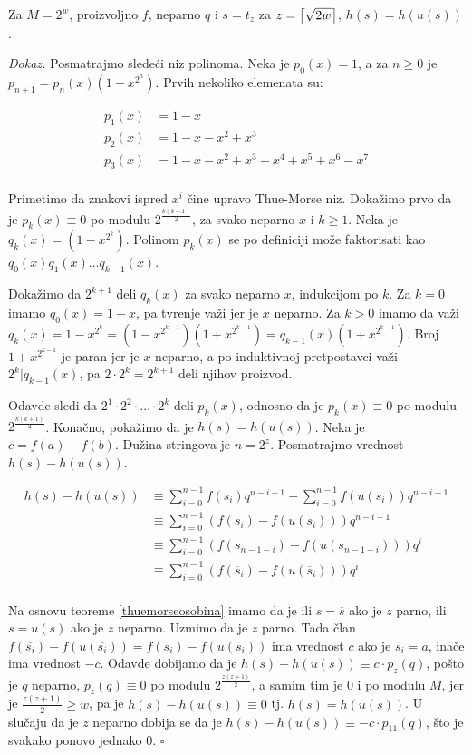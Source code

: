 \begin{thm}
Za $M = 2^{w}$, proizvoljno $f$, neparno $q$ i $s = t_z$ za $z = \left \lceil \sqrt{2w} \right \rceil$, $h(s) = h(u(s))$.
\end{thm}

\textit{Dokaz.} Posmatrajmo slede\' ci niz polinoma. Neka je $p_0(x) = 1$, a za $n \geq 0$ je $p_{n+1} = p_n(x)(1-x^{2^n})$. Prvih nekoliko elemenata su:

\begin{align*}
    p_1(x) & = 1-x \\
    p_2(x) & = 1-x-x^2+x^3 \\
    p_3(x) & = 1 - x - x^2 + x^3 - x^4 + x^5 + x^6 - x^7 \\
\end{align*}

Primetimo da znakovi ispred $x^i$ \v cine upravo Thue-Morse niz. Doka\v zimo prvo da je $p_k(x) \equiv 0$ po modulu $2^\frac{k(k+1)}{2}$, za svako neparno $x$ i $k \geq 1$. Neka je $q_k(x) = (1-x^{2^k})$. Polinom $p_k(x)$ se po definiciji mo\v ze faktorisati kao $q_0(x)q_1(x)\ldots q_{k-1}(x)$.

Doka\v zimo da $2^{k+1}$ deli $q_k(x)$ za svako neparno $x$, indukcijom po $k$. Za $k=0$ imamo $q_0(x) = 1-x$, pa tvr\dj enje va\v zi jer je $x$ neparno. Za $k > 0$ imamo da va\v zi $q_k(x) = 1-x^{2^k} = (1-x^{2^{k-1}})(1+x^{2^{k-1}}) = q_{k-1}(x)(1+x^{2^{k-1}})$. Broj $1+x^{2^{k-1}}$ je paran jer je $x$ neparno, a po induktivnoj pretpostavci va\v zi $2^k | q_{k-1}(x)$, pa $2\cdot 2^k = 2^{k+1}$ deli njihov proizvod.

Odavde sledi da $2^1\cdot2^2\cdot \ldots \cdot 2^k$ deli $p_k(x)$, odnosno da je $p_k(x) \equiv 0$ po modulu $2^\frac{k(k+1)}{2}$. Kona\v cno, poka\v zimo da je $h(s) = h(u(s))$. Neka je $c = f(a) - f(b)$. Du\v zina stringova je $n = 2^z$. Posmatrajmo vrednost $h(s) - h(u(s))$.

\begin{align*}
h(s) - h(u(s)) & \equiv \sum_{i=0}^{n-1}f(s_i) q^{n-i-1} - \sum_{i=0}^{n-1}f(u(s_i)) q^{n-i-1} \\
               & \equiv \sum_{i=0}^{n-1}(f(s_i) - f(u(s_i))) q^{n-i-1} \\
               & \equiv \sum_{i=0}^{n-1}(f(s_{n-1-i}) - f(u(s_{n-1-i}))) q^i \\
               & \equiv \sum_{i=0}^{n-1}(f(\overline{s}_i) - f(u(\overline{s}_i))) q^i \\
\end{align*}

Na osnovu teoreme \ref{thuemorseosobina} imamo da je ili $s = \overline{s}$ ako je $z$ parno, ili $s = u(s)$ ako je $z$ neparno. Uzmimo da je $z$ parno. Tada \v clan $f(\overline{s_i}) - f(u(\overline{s_i})) = f(s_i) - f(u(s_i))$ ima vrednost $c$ ako je $s_i = a$, ina\v ce ima vrednost $-c$.  Odavde dobijamo da je $h(s) - h(u(s)) \equiv c\cdot p_{z}(q)$, po\v sto je $q$ neparno, $p_{z}(q) \equiv 0$ po modulu $2^\frac{z(z+1)}{2}$, a samim tim je $0$ i po modulu $M$, jer je $\frac{z(z+1)}{2} \geq w$, pa je $h(s) - h(u(s)) \equiv 0$ tj. $h(s) = h(u(s))$. U slu\v caju da je $z$ neparno dobija se da je $h(s) - h(u(s)) \equiv -c\cdot p_{11}(q)$, \v sto je svakako ponovo jednako $0$. \hfill $\square$

